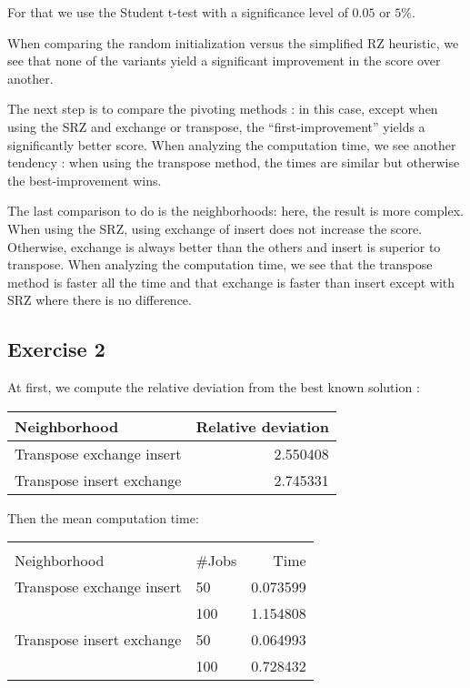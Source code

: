 \documentclass[a4paper]{article}
\begin{document}
For that we use the Student t-test with a significance level of $0.05$ or $5\%$.

When comparing the random initialization versus the simplified RZ heuristic, we see that none of the variants yield a significant improvement in the score over another.

The next step is to compare the pivoting methods : in this case, except when using the SRZ and exchange or transpose, the ``first-improvement'' yields a significantly better score.
When analyzing the computation time, we see another tendency  : when using the transpose method, the times are similar but otherwise the best-improvement wins.

The last comparison to do is the neighborhoods: here, the result is more complex.
When using the SRZ, using exchange of insert does not increase the score.
Otherwise, exchange is always better than the others and insert is superior to transpose.
When analyzing the computation time, we see that the transpose method is faster all the time and that exchange is faster than insert except with SRZ where there is no difference.

\subsection{Exercise 2}
At first, we compute the relative deviation from the best known solution :

\begin{center}
\begin{tabular}{lr}
\toprule
Neighborhood &  Relative deviation  \\
\midrule
Transpose exchange insert      &       2.550408 \\
Transpose insert exchange      &       2.745331 \\
\bottomrule
\end{tabular}
\end{center}

Then the mean computation time:


\begin{center}
\begin{tabular}{llr}
\toprule
        &     &       \\
Neighborhood & \#Jobs &   Time  \\
\midrule
Transpose exchange insert & 50  &  0.073599 \\
        & 100 &  1.154808 \\
Transpose insert exchange & 50  &  0.064993 \\
        & 100 &  0.728432 \\
\bottomrule
\end{tabular}
\end{center}
\end{document}
